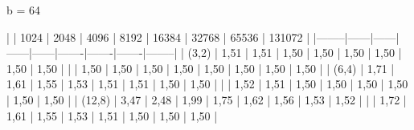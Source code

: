 
b = 64

|        | 1024 | 2048 | 4096 | 8192 | 16384 | 32768 | 65536 | 131072 |
|--------|------|------|------|------|-------|-------|-------|--------|
| (3,2)  | 1,51 | 1,51 | 1,50 | 1,50 | 1,50  | 1,50  | 1,50  | 1,50   |
|        | 1,50 | 1,50 | 1,50 | 1,50 | 1,50  | 1,50  | 1,50  | 1,50   |
| (6,4)  | 1,71 | 1,61 | 1,55 | 1,53 | 1,51  | 1,51  | 1,50  | 1,50   |
|        | 1,52 | 1,51 | 1,50 | 1,50 | 1,50  | 1,50  | 1,50  | 1,50   |
| (12,8) | 3,47 | 2,48 | 1,99 | 1,75 | 1,62  | 1,56  | 1,53  | 1,52   |
|        | 1,72 | 1,61 | 1,55 | 1,53 | 1,51  | 1,50  | 1,50  | 1,50   |

